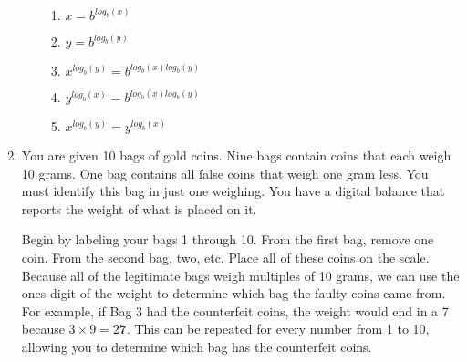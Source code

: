 \documentclass[12pt]{article}
\begin{document}
\begin{enumerate}
\begin{enumerate}
                \begin{enumerate}
                    \item $x = b^{log_b(x)}$
                    \item $y = b^{log_b(y)}$
                    \item $x^{log_b(y)} = b^{log_b(x)log_b(y)}$
                    \item $y^{log_b(x)} = b^{log_b(x)log_b(y)}$
                    \item $x^{log_b (y)} = y^{log_b (x)}$
                \end{enumerate}
        \end{enumerate}
    \item You are given 10 bags of gold coins. Nine bags contain coins that
    each weigh 10 grams. One bag contains all false coins that weigh one gram
    less. You must identify this bag in just one weighing. You have a digital
    balance that reports the weight of what is placed on it.

    Begin by labeling your bags 1 through 10. From the first bag, remove one
    coin. From the second bag, two, etc. Place all of these coins on the scale.
    Because all of the legitimate bags weigh multiples of 10 grams, we can use
    the ones digit of the weight to determine which bag the faulty coins came
    from. For example, if Bag 3 had the counterfeit coins, the weight would end
    in a 7 because $3 \times 9 = 2${\bf 7}. This can be repeated for every
    number from 1 to 10, allowing you to determine which bag has the
    counterfeit coins.


\end{enumerate}
\end{document}
